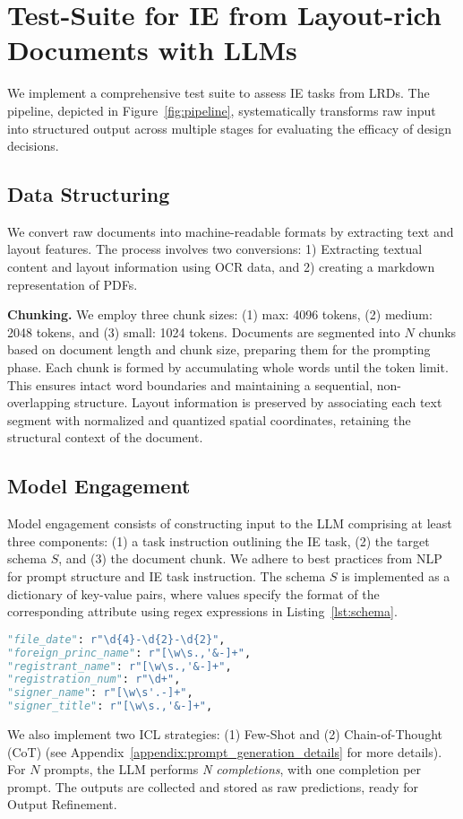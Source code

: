 \section{Test-Suite for IE from Layout-rich Documents with LLMs}
\label{sec:test_suite_IE_layout}

We implement a comprehensive test suite to assess IE tasks from LRDs. The pipeline, depicted in Figure~\ref{fig:pipeline}, systematically transforms raw input into structured output across multiple stages for evaluating the efficacy of design decisions.



\subsection{Data Structuring}
We convert raw documents into machine-readable formats by extracting text and layout features. The process involves two conversions: %
1) Extracting textual content and layout information using OCR data, and 2) creating a markdown representation of PDFs.

\noindent \textbf{Chunking.}
We employ three chunk sizes: (1) max: 4096 tokens, (2) medium: 2048 tokens, and (3) small: 1024 tokens. Documents are segmented into $N$ chunks based on document length and chunk size, preparing them for the prompting phase. Each chunk is formed by accumulating whole words until the token limit. This ensures intact word boundaries and maintaining a sequential, non-overlapping structure. Layout information is preserved by associating each text segment with
normalized and quantized spatial coordinates, retaining the structural context of the document.
\subsection{Model Engagement}
Model engagement consists of constructing input to the LLM comprising at least three components: (1) a task instruction outlining the IE task, (2) the target schema $S$, and (3) the document chunk.
We adhere to best practices from NLP for prompt structure and IE task instruction. The schema $S$ is implemented as a dictionary of key-value pairs, where values specify the format of the corresponding attribute using regex expressions in Listing~\ref{lst:schema}.

\begin{lstlisting}[language=Python, caption={Schema Definition}, label={lst:schema}]
"file_date": r"\d{4}-\d{2}-\d{2}",
"foreign_princ_name": r"[\w\s.,'&-]+",
"registrant_name": r"[\w\s.,'&-]+",
"registration_num": r"\d+",
"signer_name": r"[\w\s'.-]+",
"signer_title": r"[\w\s.,'&-]+",
\end{lstlisting}
We also implement two ICL strategies: (1) Few-Shot and (2) Chain-of-Thought (CoT)
(see Appendix~\ref{appendix:prompt_generation_details} for more details).
For $N$ prompts, the LLM performs \emph{N completions}, with one completion per prompt. The outputs are collected and stored as raw predictions, ready for Output Refinement.

